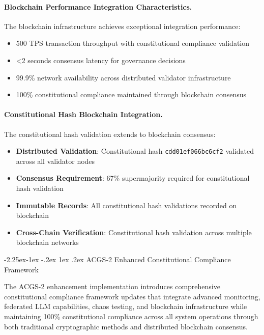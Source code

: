 \documentclass[manuscript,screen,9pt]{acmart}
\makeatletter
\renewcommand\subsection{\@startsection{subsection}{2}{\z@}%
  {-2.25ex\@plus -1ex \@minus -.2ex}%
  {1ex \@plus .2ex}%
  {\normalfont\large\bfseries}}
\makeatother
\begin{document}
\paragraph{Blockchain Performance Integration Characteristics.} The blockchain infrastructure achieves exceptional integration performance:
\begin{itemize}[itemsep=1pt,parsep=1pt]
    \item 500 TPS transaction throughput with constitutional compliance validation
    \item <2 seconds consensus latency for governance decisions
    \item 99.9\% network availability across distributed validator infrastructure
    \item 100\% constitutional compliance maintained through blockchain consensus
\end{itemize}

\paragraph{Constitutional Hash Blockchain Integration.} The constitutional hash validation extends to blockchain consensus:
\begin{itemize}[itemsep=1pt,parsep=1pt]
    \item \textbf{Distributed Validation}: Constitutional hash \texttt{cdd01ef066bc6cf2} validated across all validator nodes
    \item \textbf{Consensus Requirement}: 67\% supermajority required for constitutional hash validation
    \item \textbf{Immutable Records}: All constitutional hash validations recorded on blockchain
    \item \textbf{Cross-Chain Verification}: Constitutional hash validation across multiple blockchain networks
\end{itemize}

\subsection{ACGS-2 Enhanced Constitutional Compliance Framework}
\label{subsec:acgs2_constitutional_compliance}

The ACGS-2 enhancement implementation introduces comprehensive constitutional compliance framework updates that integrate advanced monitoring, federated LLM capabilities, chaos testing, and blockchain infrastructure while maintaining 100\% constitutional compliance across all system operations through both traditional cryptographic methods and distributed blockchain consensus.
\end{document}
